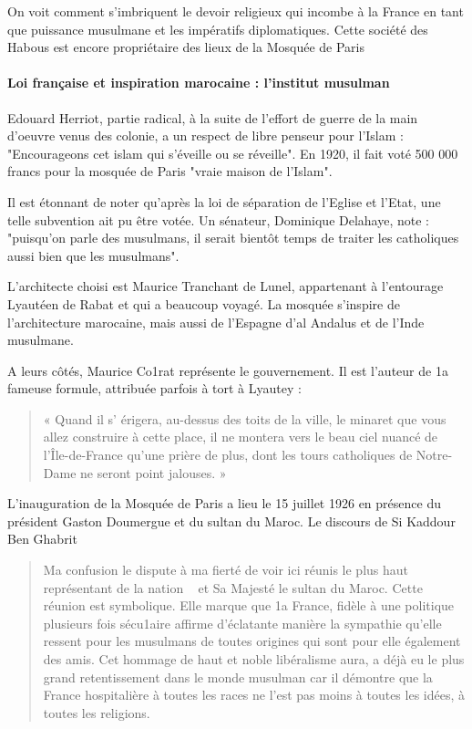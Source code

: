 \begin{Synthesis}
On voit comment
s'imbriquent le devoir religieux qui incombe à la France en tant
que puissance musulmane et les impératifs diplomatiques.
Cette société des Habous est encore propriétaire des lieux de la Mosquée de Paris
\end{Synthesis}

\paragraph{Loi française et inspiration marocaine : l'institut musulman}
Edouard Herriot, partie radical, à la suite de l'effort de guerre de la main d'oeuvre venus des colonie, a un respect de libre penseur pour l'Islam : "Encourageons cet islam qui s'éveille ou se réveille". En 1920, il fait voté 500 000 francs pour la mosquée de Paris "vraie maison de l'Islam".

Il est étonnant de noter qu'après la loi de séparation de l'Eglise et l'Etat, une telle subvention ait pu être votée. Un sénateur, Dominique Delahaye, note : "puisqu'on parle des musulmans, il serait bientôt temps de traiter les catholiques aussi bien que les musulmans".

L'architecte choisi est Maurice Tranchant de Lunel, appartenant à l'entourage Lyautéen de Rabat et qui a beaucoup voyagé. La mosquée s'inspire de l'architecture marocaine, mais aussi de l'Espagne d'al Andalus et de l'Inde musulmane. 

A leurs côtés,
Maurice Co1rat représente le gouvernement. Il est l'auteur de
1a fameuse formule, attribuée parfois à tort à Lyautey :
\begin{quote}
    « Quand
il s' érigera, au-dessus des toits de la ville, le minaret que vous
allez construire à cette place, il ne montera vers le beau ciel
nuancé de l'Île-de-France qu'une prière de plus, dont les tours
catholiques de Notre-Dame ne seront point jalouses. »
\end{quote}

L'inauguration de la Mosquée de Paris a lieu le 15 juillet 1926 en présence du président Gaston Doumergue et du sultan du Maroc. Le discours de Si Kaddour Ben Ghabrit 
\begin{quote}
    
Ma confusion le dispute à
ma fierté de voir ici réunis le plus haut représentant de la nation
~ et Sa Majesté le sultan du Maroc. Cette réunion est symbolique. Elle marque que 1a France, fidèle à une politique plusieurs
fois sécu1aire affirme d'éclatante manière la sympathie qu'elle ressent pour les musulmans de toutes origines qui sont pour elle également des amis. Cet hommage de haut et noble libéralisme aura, a déjà eu le plus grand retentissement dans le monde musulman car il démontre que la France hospitalière à toutes les races ne l'est pas moins à toutes les idées, à toutes les religions. \end{quote}

